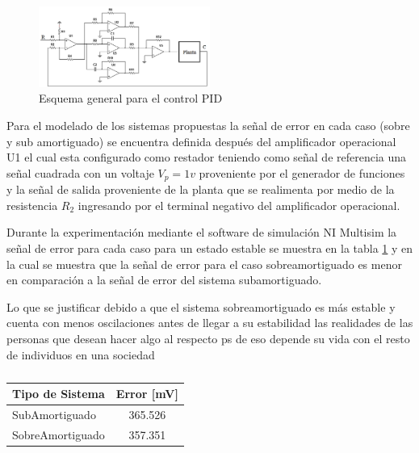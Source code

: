\documentclass[conference]{IEEEtran}
\begin{document}
	\begin{figure}[h]
		\centering
		\includegraphics[width=0.5\textwidth]{media/esquematico-general.png}
		\caption{Esquema general para el control PID}
		\label{fig:esquematico-general}
	\end{figure}
	
	Para el modelado de los sistemas propuestas la señal de error en cada caso (sobre y sub amortiguado) se encuentra definida después del amplificador operacional U1 el cual esta configurado como restador teniendo como señal de referencia una señal cuadrada con un voltaje $V_{p} = 1v$ proveniente por el generador de funciones y la señal de salida proveniente de la planta que se realimenta por medio de la resistencia $R_2$ ingresando por el terminal negativo del amplificador operacional.
	
	Durante la experimentación mediante el software de simulación NI Multisim la señal de error para cada caso para un estado estable se muestra en la tabla \ref{tb:senal-error} y en la cual se muestra que la señal de error para el caso sobreamortiguado es menor en comparación a la señal de error del sistema subamortiguado.
	
	Lo que se justificar debido a que el sistema sobreamortiguado es más estable y cuenta con menos oscilaciones antes de llegar a su estabilidad
	las realidades de las personas que desean hacer algo al respecto ps de eso depende su vida con el resto de individuos en una sociedad
	
	\begin{table}[]
		\centering
		\caption{}
		\label{tb:senal-error}
		\begin{tabular}{|l|c|}
			\hline
			\multicolumn{1}{|c|}{\textbf{Tipo de Sistema}} & \textbf{Error {[}mV{]}} \\ \hline
			SubAmortiguado                                 & 365.526                 \\ \hline
			SobreAmortiguado                               & 357.351                 \\ \hline
		\end{tabular}
	\end{table}
	
\end{document}
